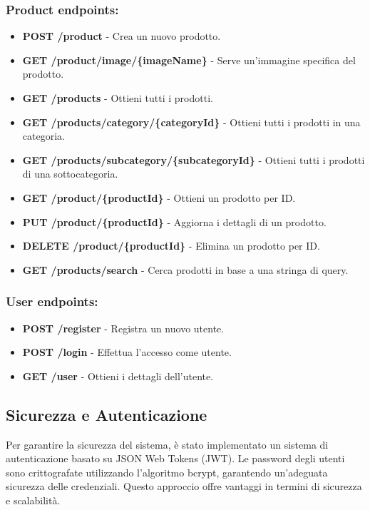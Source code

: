 \subsubsection{Product endpoints:}
\begin{itemize}
    \item \textbf{POST /product} - Crea un nuovo prodotto.
    \item \textbf{GET /product/image/\{imageName\}} - Serve un'immagine specifica del prodotto.
    \item \textbf{GET /products} - Ottieni tutti i prodotti.
    \item \textbf{GET /products/category/\{categoryId\}} - Ottieni tutti i prodotti in una categoria.
    \item \textbf{GET /products/subcategory/\{subcategoryId\}} - Ottieni tutti i prodotti di una sottocategoria.
    \item \textbf{GET /product/\{productId\}} - Ottieni un prodotto per ID.
    \item \textbf{PUT /product/\{productId\}} - Aggiorna i dettagli di un prodotto.
    \item \textbf{DELETE /product/\{productId\}} - Elimina un prodotto per ID.
    \item \textbf{GET /products/search} - Cerca prodotti in base a una stringa di query.
\end{itemize}

\subsubsection{User endpoints:}
\begin{itemize}
    \item \textbf{POST /register} - Registra un nuovo utente.
    \item \textbf{POST /login} - Effettua l'accesso come utente.
    \item \textbf{GET /user} - Ottieni i dettagli dell'utente.
\end{itemize}

\subsection{Sicurezza e Autenticazione}
Per garantire la sicurezza del sistema, è stato implementato un sistema di autenticazione basato su JSON Web Tokens (JWT). Le password degli utenti sono crittografate utilizzando l'algoritmo bcrypt, garantendo un'adeguata sicurezza delle credenziali. Questo approccio offre vantaggi in termini di sicurezza e scalabilità.

